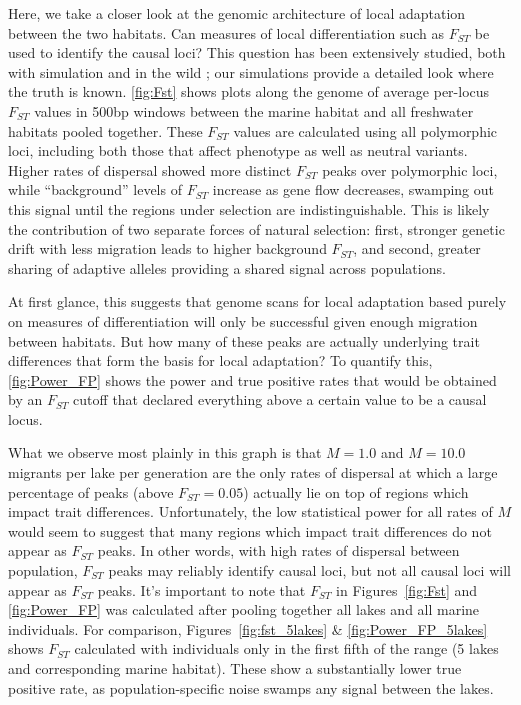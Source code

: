 \documentclass{article}
\begin{document}
Here, we take a closer look at the genomic architecture of local adaptation between the two habitats. 
Can measures of local differentiation such as $F_{ST}$ be used to identify the causal loci? 
This question has been extensively studied,
both with simulation \citep[e.g.,][]{southcott2017neutral,lotterhos2015relative}
and in the wild \citep[reviewed in][]{harrison2016heterogeneous,hoban2016finding};
our simulations provide a detailed look where the truth is known.
\autoref{fig:Fst} shows plots along the genome of average per-locus $F_{ST}$ values in 500bp windows between the marine habitat and all freshwater habitats pooled together. 
These $F_{ST}$ values are calculated using all polymorphic loci,
including both those that affect phenotype as well as neutral variants. 
Higher rates of dispersal showed more distinct $F_{ST}$ peaks over polymorphic loci, while ``background'' levels of $F_{ST}$ increase as gene flow decreases, swamping out this signal until the regions under selection are indistinguishable. This is likely the contribution of two separate forces of natural selection: 
first, stronger genetic drift with less migration leads to higher background $F_{ST}$, and second, greater sharing of adaptive alleles providing a shared signal across populations.

At first glance, this suggests that genome scans for local adaptation based purely on measures of differentiation will only be successful given enough migration between habitats. 
But how many of these peaks are actually underlying trait differences that form the basis for local adaptation? 
To quantify this, \autoref{fig:Power_FP} shows the power and true positive rates that would be obtained by an $F_{ST}$ cutoff that declared everything above a certain value to be a causal locus. 

What we observe most plainly in this graph is that $M = 1.0$ and $M = 10.0$ migrants per lake per generation 
are the only rates of dispersal at which a large percentage of peaks (above $F_{ST} = 0.05$) 
actually lie on top of regions which impact trait differences.
Unfortunately, the low statistical power for all rates of $M$ would seem to suggest that many regions which impact trait differences do not appear as $F_{ST}$ peaks. 
In other words, with high rates of dispersal between population, $F_{ST}$ peaks may reliably identify causal loci, 
but not all causal loci will appear as $F_{ST}$ peaks.
It's important to note that $F_{ST}$ in Figures~\ref{fig:Fst} and \ref{fig:Power_FP} was calculated after pooling together all lakes and all marine individuals.
For comparison, Figures~\ref{fig:fst_5lakes} \& \ref{fig:Power_FP_5lakes} shows $F_{ST}$ calculated with individuals only in the first fifth of the range (5 lakes and corresponding marine habitat).
These show a substantially lower true positive rate, as population-specific noise swamps any signal between the lakes.
\end{document}
